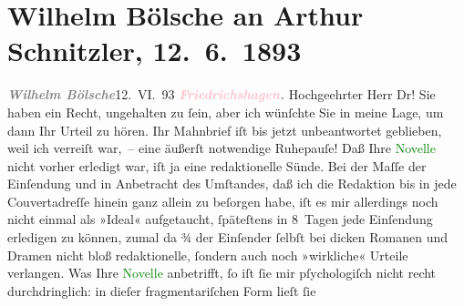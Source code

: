 

               \section[Wilhelm Bölsche an Arthur Schnitzler, 12. 6. 1893]{ Wilhelm Bölsche an Arthur Schnitzler, 12. 6. 1893}\nopagebreak{}\rehead{ }\normalsize\beginnumbering{} \toendnotes[C]{\smallbreak\pagebreak[2]} 
\toendnotes[C]{\smallbreak}\pstart
           {\pb}\textcolor{gray}{\textbf{\textit{Wilhelm Bölsche}}}\hfill 12. VI. 93\pend
           \pstart
           \textcolor{gray}{\textbf{\textit{\textcolor{pink}{Friedrichshagen}{}\ledrightnote{\textcolor{pink}{Friedrichshagen}}.}}}\pend
           \pstart{}Hochgeehrter Herr Dr!\pend\pstart
           Sie haben ein Recht, ungehalten zu ſein, aber ich wünſchte Sie in meine Lage, um dann
               Ihr Urteil zu hören. Ihr Mahnbrief iſt bis jetzt unbeantwortet geblieben, weil ich
               verreiſt war, – eine äußerſt notwendige Ruhepauſe! Daß Ihre \textcolor{green}{Novelle}{}\ledrightnote{\textcolor{green}{Die Braut}} nicht vorher erledigt war, iſt ja eine redaktionelle
               Sünde. Bei der Maſſe der Einſendung und in Anbetracht des Umſtandes, daß ich die
               Redaktion bis in jede Couvertadreſſe hinein ganz allein zu beſorgen habe, iſt es mir
               allerdings noch nicht einmal als »Ideal« aufgetaucht, ſpäteſtens in 8 Tagen {\pb}jede Einſendung erledigen zu können, zumal da ¾ der
               Einſender ſelbſt bei dicken Romanen und Dramen nicht bloß redaktionelle, ſondern auch
               noch »wirkliche« Urteile verlangen.\pend
           \pstart
           Was Ihre \textcolor{green}{Novelle}{}\ledrightnote{\textcolor{green}{Die Braut}} anbetrifft, ſo iſt ſie mir
               pſychologiſch nicht recht durchdringlich: in dieſer fragmentariſchen Form lieſt ſie
